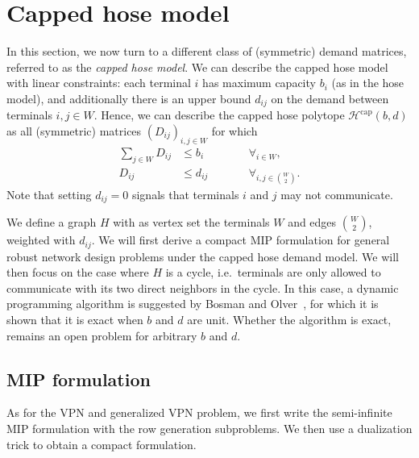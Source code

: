\section{Capped hose model}
In this section, we now turn to a different class of (symmetric) demand matrices, referred to as the \emph{capped hose model}.
We can describe the capped hose model with linear constraints: each terminal $i$ has maximum capacity $b_i$ (as in the hose model), and additionally there is an upper bound $d_{ij}$ on the demand between terminals $i,j \in W$.
Hence, we can describe the capped hose polytope $\mathcal H^\text{cap}(b, d)$ as all (symmetric) matrices $(D_{ij})_{i,j \in W}$ for which
\[
    \begin{split}
        \sum_{j \in W} D_{ij} &\le b_i \qquad&&\forall_{i \in W}, \\
        D_{ij} &\le d_{ij} \qquad&&\forall_{i,j \in \binom W 2}.
    \end{split}
\]
Note that setting $d_{ij} = 0$ signals that terminals $i$ and $j$ may not communicate.

We define a graph $H$ with as vertex set the terminals $W$ and edges $\binom W 2$, weighted with $d_{ij}$.
We will first derive a compact MIP formulation for general robust network design problems under the capped hose demand model.
We will then focus on the case where $H$ is a cycle, i.e.\ terminals are only allowed to communicate with its two direct neighbors in the cycle.
In this case, a dynamic programming algorithm is suggested by Bosman and Olver~\cite{bosman2017exploring}, for which it is shown that it is exact when $b$ and $d$ are unit.
Whether the algorithm is exact, remains an open problem for arbitrary $b$ and $d$.

\subsection{MIP formulation}
As for the VPN and generalized VPN problem, we first write the semi-infinite MIP formulation with the row generation subproblems.
We then use a dualization trick to obtain a compact formulation.

